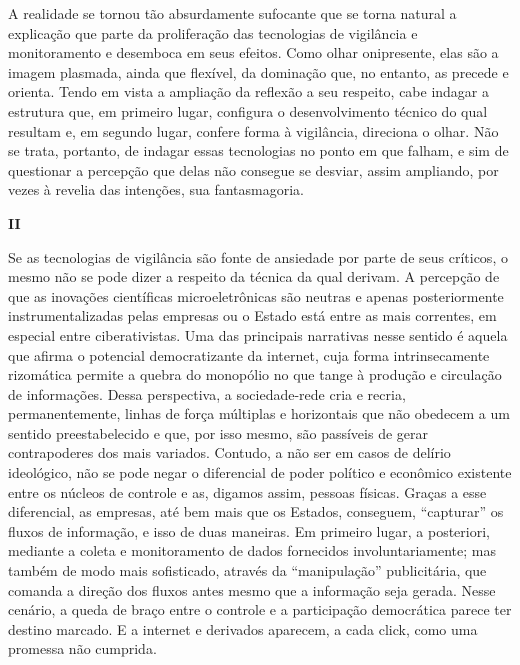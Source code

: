 A realidade se tornou tão absurdamente sufocante que se torna natural a
explicação que parte da proliferação das tecnologias de vigilância e
monitoramento e desemboca em seus efeitos. Como olhar onipresente, elas
são a imagem plasmada, ainda que flexível, da dominação que, no entanto,
as precede e orienta. Tendo em vista a ampliação da reflexão a seu
respeito, cabe indagar a estrutura que, em primeiro lugar, configura o
desenvolvimento técnico do qual resultam e, em segundo lugar, confere
forma à vigilância, direciona o olhar. Não se trata, portanto, de
indagar essas tecnologias no ponto em que falham, e sim de questionar a
percepção que delas não consegue se desviar, assim ampliando, por vezes
à revelia das intenções, sua fantasmagoria. ~

\textbf{II}

Se as tecnologias de vigilância são fonte de ansiedade por parte de seus
críticos, o mesmo não se pode dizer a respeito da técnica da qual
derivam. A percepção de que as inovações científicas microeletrônicas
são neutras e apenas posteriormente instrumentalizadas pelas empresas ou
o Estado está entre as mais correntes, em especial entre ciberativistas.
Uma das principais narrativas nesse sentido é aquela que afirma o
potencial democratizante da internet, cuja forma intrinsecamente
rizomática permite a quebra do monopólio no que tange à produção e
circulação de informações. Dessa perspectiva, a sociedade-rede cria e
recria, permanentemente, linhas de força múltiplas e horizontais que não
obedecem a um sentido preestabelecido e que, por isso mesmo, são
passíveis de gerar contrapoderes dos mais variados. Contudo, a não ser
em casos de delírio ideológico, não se pode negar o diferencial de poder
político e econômico existente entre os núcleos de controle e as,
digamos assim, pessoas físicas. Graças a esse diferencial, as empresas,
até bem mais que os Estados, conseguem, ``capturar'' os fluxos de
informação, e isso de duas maneiras. Em primeiro lugar, a posteriori,
mediante a coleta e monitoramento de dados fornecidos involuntariamente;
mas também de modo mais sofisticado, através da ``manipulação''
publicitária, que comanda a direção dos fluxos antes mesmo que a
informação seja gerada. Nesse cenário, a queda de braço entre o controle
e a participação democrática parece ter destino marcado. E a internet e
derivados aparecem, a cada click, como uma promessa não cumprida. ~~

